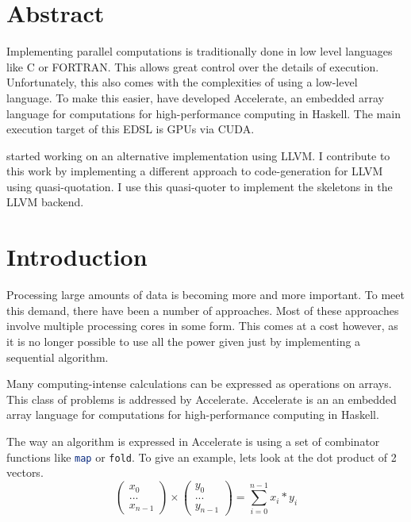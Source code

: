 \documentclass[a4paper,bibliography=totocnumbered,parskip,headsepline]{scrbook}
\begin{document}
\chapter*{Abstract}
Implementing parallel computations is traditionally done in low level languages like C or FORTRAN.
This allows great control over the details of execution.
Unfortunately, this also comes with the complexities of using a low-level language.
To make this easier, \citeauthor{chakravarty2011accelerating} have developed Accelerate, an embedded array language for computations for high-performance computing in Haskell.
The main execution target of this EDSL is GPUs via CUDA.

\citeauthor{trevor2014llvm} started working on an alternative implementation using LLVM.
I contribute to this work by implementing a different approach to code-generation for LLVM using quasi-quotation.
I use this quasi-quoter to implement the skeletons in the LLVM backend.

\listoftodos
\tableofcontents   %
\listoffigures     %
\listoftables      %
\mainmatter

\chapter{Introduction}
Processing large amounts of data is becoming more and more important.
To meet this demand, there have been a number of approaches.
Most of these approaches involve multiple processing cores in some form.
This comes at a cost however, as it is no longer possible to use all the power given just by implementing a sequential algorithm.

Many computing-intense calculations can be expressed as operations on arrays.
This class of problems is addressed by Accelerate\cite{chakravarty2011accelerating,mcdonelloptimising}.
Accelerate is an an embedded array language for computations for high-performance computing in Haskell.

The way an algorithm is expressed in Accelerate is using a set of combinator functions like \lstinline[language=haskell]!map! or \lstinline[language=haskell,morekeywords={fold}]!fold!.
To give an example, lets look at the dot product of 2 vectors.
\[
\begin{pmatrix}
x_0 \\ ... \\ x_{n-1}
\end{pmatrix}
\times
\begin{pmatrix}
y_0 \\ ... \\ y_{n-1}
\end{pmatrix}
= \displaystyle\sum_{i=0}^{n-1} x_i*y_i
\]
\end{document}
